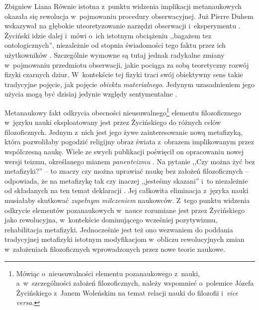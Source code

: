 \begin{artplenv}{Zbigniew Liana}
Równie istotna z~punktu widzenia implikacji metanaukowych okazała się rewolucja w~pojmowaniu procedury obserwacyjnej.
Już Pierre Duhem wskazywał na głębokie uteoretyzowanie narzędzi obserwacji i~eksperymentu
\parencite[zob.][s.~77–81; 85–89]{duhem_pierre_1991}.
Życiński idzie dalej i~mówi o~ich istotnym
obciążeniu ,,bagażem tez ontologicznych'', niezależnie od stopnia świadomości tego faktu przez ich użytkowników
\parencite[s.~249]{zycinski_jezyk_1983}.
 Szczególnie wymowne są tutaj jednak radykalne zmiany w~pojmowaniu
przedmiotu obserwacji, jakie pociąga za sobą teoretyczny rozwój fizyki czarnych dziur. W~kontekście tej fizyki traci
swój obiektywny sens takie tradycyjne pojęcie, jak pojęcie \textit{obiektu materialnego}. Jedynym uzasadnieniem jego
użycia mogą być dzisiaj jedynie względy sentymentalne
\parencites[s.~77]{zycinski_structure_1988}[s.~137n]{zycinski_struktura_2013}.

Metanaukowy fakt odkrycia obecności nieusuwalnego\footnote{Mówiąc o~nieusuwalności elementu
pozanaukowego z~nauki, a~w~szczególności założeń filozoficznych,
należy wspomnieć o~polemice Józefa Życińskiego
\parencite*{zycinski_czy_2009}
z~Janem Woleńskim
\parencite*{wolenski_odpowiedz_2009}
na temat relacji nauki do filozofii i~\textit{vice versa}.
} elementu
filozoficznego w~języku nauki eksploatowany jest przez Życińskiego do różnych celów filozoficznych. Jednym z~nich jest
jego żywe zainteresowanie nową metafizyką, która pozwoliłaby pogodzić religijny obraz świata z~obrazem implikowanym
przez współczesną naukę. Wiele ze swych publikacji poświęcił on opracowaniu nowej wersji teizmu, określanego mianem
\textit{panenteizmu} \parencite[zob. np.][]{zycinski_teizm_1988}.
Na pytanie ,,Czy można żyć bez metafizyki?'' -- to znaczy
czy można uprawiać naukę bez założeń filozoficznych -- odpowiada, że na metafizykę tak czy inaczej
,,jesteśmy skazani'' i~to niezależnie od składanych na ten temat
deklaracji
\parencite[s.~246.249]{zycinski_jezyk_1983}.
Jej całkowita eliminacja z~języka nauki musiałaby skutkować \textit{zupełnym milczeniem} naukowców. Z~tego punktu widzenia
odkrycie elementów pozanaukowych w~nauce rozumiane jest przez Życińskiego jako rewolucyjna, w~kontekście dominującego
wcześniej pozytywizmu, rehabilitacja metafizyki. Jednocześnie jest też ono wezwaniem do poddania tradycyjnej metafizyki
istotnym modyfikacjom w~obliczu rewolucyjnych zmian w~założeniach filozoficznych wprowadzonych przez nowe teorie
naukowe. 


\end{artplenv}
